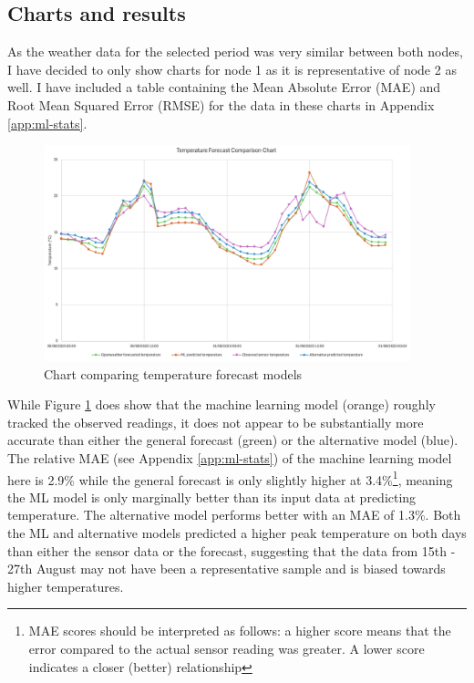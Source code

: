 \subsection{Charts and results}

As the weather data for the selected period was very similar between both nodes,
I have decided to only show charts for node 1 as it is representative of node 2
as well. I have included a table containing the Mean Absolute Error (MAE) and
Root Mean Squared Error (RMSE) for the data in these charts in Appendix
\ref{app:ml-stats}.

\begin{figure}[H]
    \centering
    \includegraphics[width=0.95\textwidth]{contents/part-4/fig4/temperature-graph.png}
    \caption{Chart comparing temperature forecast models}
    \label{fig:temperature-chart}
\end{figure}

While Figure \ref{fig:temperature-chart} does show that the machine learning
model (orange) roughly tracked the observed readings, it does not appear to be
substantially more accurate than either the general forecast (green) or the
alternative model (blue). The relative MAE (see Appendix \ref{app:ml-stats}) of
the machine learning model here is 2.9\% while the general forecast is only
slightly higher at 3.4\%\footnote{MAE scores should be interpreted as follows: a
higher score means that the error compared to the actual sensor reading was
greater. A lower score indicates a closer (better) relationship}, meaning the ML
model is only marginally better than its input data at predicting temperature.
The alternative model performs better with an MAE of 1.3\%. Both the ML and
alternative models predicted a higher peak temperature on both days than either
the sensor data or the forecast, suggesting that the data from 15th - 27th
August may not have been a representative sample and is biased towards higher
temperatures.

